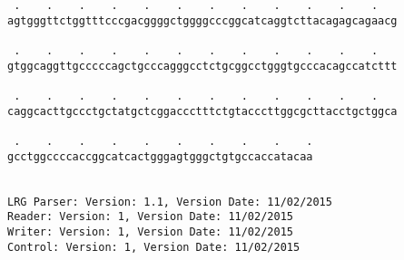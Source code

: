 \documentclass{article}
\begin{document}
\begin{Verbatim}
 .    .    .    .    .    .    .    .    .    .    .    .   
agtgggttctggtttcccgacggggctggggcccggcatcaggtcttacagagcagaacg
                                                            
 .    .    .    .    .    .    .    .    .    .    .    .   
gtggcaggttgcccccagctgcccagggcctctgcggcctgggtgcccacagccatcttt
                                                            
 .    .    .    .    .    .    .    .    .    .    .    .   
caggcacttgccctgctatgctcggaccctttctgtacccttggcgcttacctgctggca
                                                            
 .    .    .    .    .    .    .    .    .    .
gcctggccccaccggcatcactgggagtgggctgtgccaccatacaa
                                               
                                               
LRG Parser: Version: 1.1, Version Date: 11/02/2015
Reader: Version: 1, Version Date: 11/02/2015
Writer: Version: 1, Version Date: 11/02/2015
Control: Version: 1, Version Date: 11/02/2015
\end{Verbatim}
\end{document}
